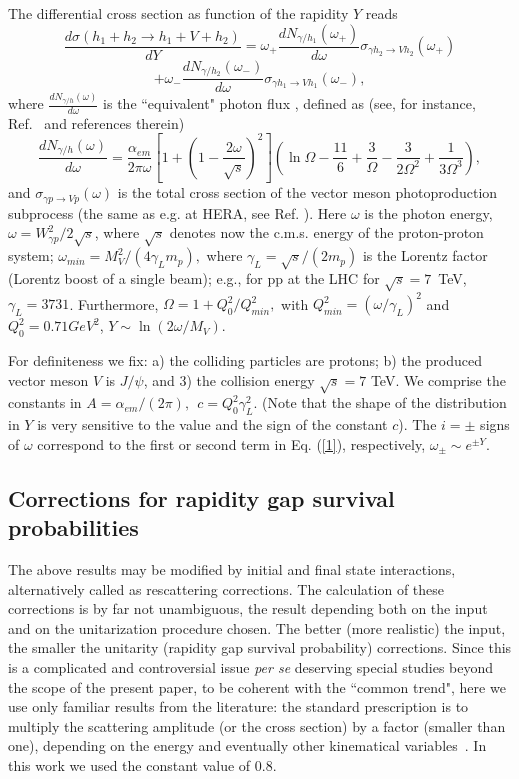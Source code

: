 \documentclass[12pt]{article}
\begin{document}
The differential cross section as function of the rapidity $Y$ reads
 $$
\frac{d\sigma (h_1+h_2\rightarrow h_1+V+h_2)}{dY}=\omega_+\frac{dN_{\gamma/h_1}(\omega_+)}{d\omega}\sigma_{\gamma h_2\rightarrow Vh_2}(\omega_+)
$$
\begin{equation}\label{1}
+\omega_-\frac{dN_{\gamma/h_2}(\omega_-)}{d\omega}\sigma_{\gamma h_1\rightarrow Vh_1}(\omega_-),
\end{equation}
where $\frac{dN_{\gamma/h}(\omega)}{d\omega}$ is the ``equivalent" photon flux \cite{Review}, defined as (see, for instance, Ref.~\cite{Brazil} and references therein) 
\begin{equation}
\frac{dN_{\gamma/h}(\omega)}{d\omega} = \frac{\alpha_{em}}{2\pi\omega}[1+(1-\frac{2\omega}{\sqrt{s}})^2]
(\ln\Omega-\frac{11}{6}+\frac{3}{\Omega}-\frac{3}{2\Omega^2}+\frac{1}{3\Omega^3}),
\label{photon_flux}
\end{equation}
and $\sigma_{\gamma p\rightarrow Vp}(\omega)$ is the total cross section of the vector meson photoproduction subprocess (the same as e.g. at HERA, see Ref. \cite{Capua}). 
Here $\omega$ is the photon energy, $\omega=W^2_{\gamma p}/2\sqrt s$, where $\sqrt s$ denotes now the c.m.s. energy of the  proton-proton system; 
$\omega_{min}=M_V^2/(4\gamma_Lm_p),$ where $\gamma_L=\sqrt s/(2m_p)$
is the Lorentz factor (Lorentz boost of a single beam); e.g., for pp at the LHC for $\sqrt{s}=7$~TeV,
$\gamma_L=3731$.
Furthermore,
$\Omega=1+Q_0^2/Q_{min}^2,$ with  $Q_{min}^2=(\omega/\gamma_L)^2$ and  $Q_0^2=0.71 GeV^2$,  
$Y\sim\ln(2\omega/M_V)$.  

For definiteness we fix: a) the colliding particles are protons;
b) the produced vector meson $V$ is $J/\psi$, and 3) the collision energy $\sqrt s=7$ TeV.
We comprise the constants in $A=\alpha_{em}/(2\pi),\ \  c=Q_0^2\gamma_L^2$.
(Note that the shape of the distribution in $Y$ is very sensitive to the value and the sign of the constant $c$).
The $i=\pm$ signs of $\omega$ correspond to the first or second term in Eq. (\ref{1}), respectively, $\omega_{\pm}\sim e^{\pm Y}$.

\subsection{Corrections for rapidity gap survival probabilities}\label{corrections}
The above results may be modified by initial and final state interactions,
alternatively called as rescattering corrections. The calculation of these
corrections is by far not unambiguous, the result depending both on the input
and on the unitarization procedure chosen. The better (more realistic) the input, the smaller the unitarity (rapidity gap survival probability) corrections.
Since this is a complicated and controversial issue {\it per se} deserving special studies beyond the scope of the present paper, to be coherent with the ``common trend", here we use only familiar results from the literature:
the standard prescription is to multiply the scattering amplitude (or the cross section) by a factor (smaller than one), depending on the energy and eventually other kinematical variables~\cite{Ryskin}.
In this work we used the constant value of 0.8.
\end{document}
